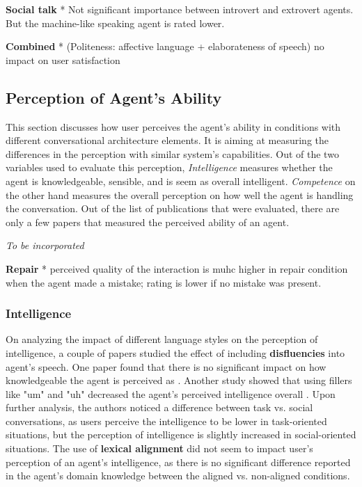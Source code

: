 \documentclass[sigconf,screen,review, anonymous]{acmart}
\newcommand{\cmt}[1]{}%
\begin{document}
\textbf{Social talk}
* Not significant importance between introvert and extrovert agents. But the machine-like speaking agent is rated lower. \cite{roy2021users}\cmt{[71]}

\textbf{Combined}
* (Politeness: affective language + elaborateness of speech) no impact on user satisfaction \cite{hu2022polite}\cmt{[76]}

\subsection{Perception of Agent's Ability}

This section discusses how user perceives the agent's ability in conditions with different conversational architecture elements. It is aiming at measuring the differences in the perception with similar system's capabilities. Out of the two variables used to evaluate this perception, \textit{Intelligence} measures whether the agent is knowledgeable, sensible, and is seem as overall intelligent. \textit{Competence} on the other hand measures the overall perception on how well the agent is handling the conversation. Out of the list of publications that were evaluated, there are only a few papers that measured the perceived ability of an agent.

\textit{To be incorporated}

\textbf{Repair}
* perceived quality of the interaction is muhc higher in repair condition when the agent made a mistake; rating is lower if no mistake was present. \cite{cuadra2021my}\cmt{[67]}

\subsubsection{Intelligence}

On analyzing the impact of different language styles on the perception of intelligence, a couple of papers studied the effect of including \textbf{disfluencies} into agent's speech. One paper found that there is no significant impact on how knowledgeable the agent is perceived as \cite{pfeifer2009should}\cmt{[12]}. Another study showed that using fillers like "um" and "uh" decreased the agent's perceived intelligence overall \cite{jeong2019exploring}\cmt{[10]}. Upon further analysis, the authors noticed a difference between task vs. social conversations, as users perceive the intelligence to be lower in task-oriented situations, but the perception of intelligence is slightly increased in social-oriented situations. The use of \textbf{lexical alignment} did not seem to impact user's perception of an agent's intelligence, as there is no significant difference reported in the agent's domain knowledge between the aligned vs. non-aligned conditions.
\end{document}
